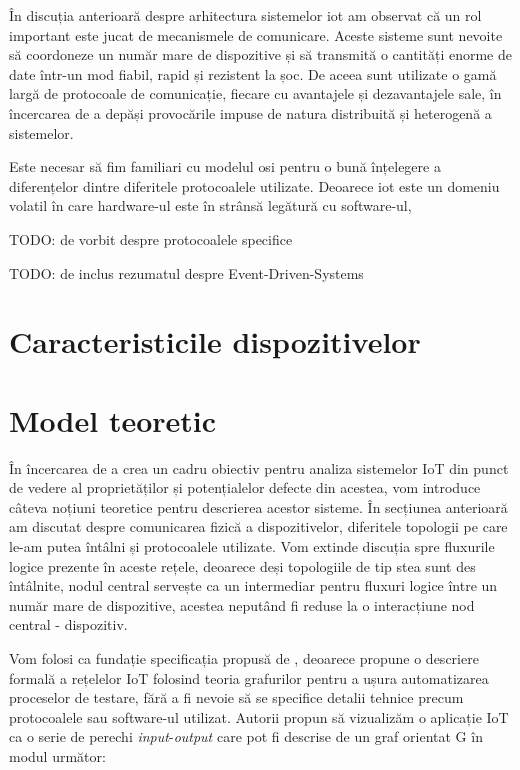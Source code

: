În discuția anterioară despre arhitectura sistemelor \acrshort{iot} am observat că un rol important este jucat de mecanismele de comunicare. Aceste sisteme sunt nevoite să coordoneze un număr mare de dispozitive și să transmită o cantități enorme de date într-un mod fiabil, rapid și rezistent la șoc. De aceea sunt utilizate o gamă largă de protocoale de comunicație, fiecare cu avantajele și dezavantajele sale, în încercarea de a depăși provocările impuse de natura distribuită și heterogenă a sistemelor. 

Este necesar să fim familiari cu modelul \acrfull{osi} pentru o bună înțelegere a diferențelor dintre diferitele protocoalele utilizate. Deoarece \acrshort{iot} este un domeniu volatil în care hardware-ul este în strânsă legătură cu software-ul, 


TODO: de vorbit despre protocoalele specifice

TODO: de inclus rezumatul despre Event-Driven-Systems

\section{Caracteristicile dispozitivelor}

\section{Model teoretic}

În încercarea de a crea un cadru obiectiv pentru analiza sistemelor IoT din punct de vedere al proprietăților și potențialelor defecte din acestea, vom introduce câteva noțiuni teoretice pentru descrierea acestor sisteme. În secțiunea anterioară am discutat despre comunicarea fizică a dispozitivelor, diferitele topologii pe care le-am putea întâlni și protocoalele utilizate. Vom extinde discuția spre fluxurile logice prezente în aceste rețele, deoarece deși topologiile de tip stea sunt des întâlnite, nodul central servește ca un intermediar pentru fluxuri logice între un număr mare de dispozitive, acestea neputând fi reduse la o interacțiune nod central - dispozitiv.

Vom folosi ca fundație specificația propusă de \cite{Paduraru2021}, deoarece propune o descriere formală a rețelelor IoT folosind teoria grafurilor pentru a ușura automatizarea proceselor de testare, fără a fi nevoie să se specifice detalii tehnice precum protocoalele sau software-ul utilizat. Autorii propun să vizualizăm o aplicație IoT ca o serie de perechi \textit{input}-\textit{output} care pot fi descrise de un graf orientat G în modul următor:

